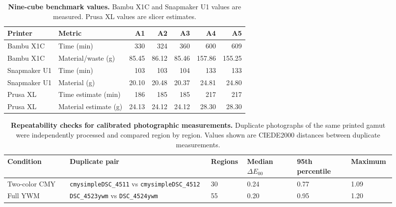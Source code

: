 \documentclass[preprint,12pt,authoryear]{elsarticle}
\begin{document}
\begin{table}[H]
\centering
\caption{\textbf{Nine-cube benchmark values.}
Bambu X1C and Snapmaker U1 values are measured. Prusa XL values are slicer estimates.}
\small
\begin{tabular}{llrrrrr}
\toprule
Printer & Metric & A1 & A2 & A3 & A4 & A5 \\
\midrule
Bambu X1C & Time (min) & 330 & 324 & 360 & 600 & 609 \\
Bambu X1C & Material/waste (g) & 85.45 & 86.12 & 85.46 & 157.86 & 155.25 \\
Snapmaker U1 & Time (min) & 103 & 103 & 104 & 133 & 133 \\
Snapmaker U1 & Material (g) & 20.10 & 20.48 & 20.37 & 24.81 & 24.80 \\
Prusa XL & Time estimate (min) & 186 & 185 & 185 & 217 & 217 \\
Prusa XL & Material estimate (g) & 24.13 & 24.12 & 24.12 & 28.30 & 28.30 \\
\bottomrule
\end{tabular}
\label{tab:supp-benchmark-values}
\end{table}

\begin{table}[H]
\centering
\caption{\textbf{Repeatability checks for calibrated photographic measurements.}
Duplicate photographs of the same printed gamut were independently processed and compared region by region. Values shown are CIEDE2000 distances between duplicate measurements.}
\scriptsize
\setlength{\tabcolsep}{2pt}
\begin{tabular}{@{}p{0.15\linewidth}p{0.34\linewidth}p{0.08\linewidth}p{0.12\linewidth}p{0.13\linewidth}p{0.10\linewidth}@{}}
\toprule
Condition & Duplicate pair & Regions & Median \(\Delta E_{00}\) & 95th percentile & Maximum \\
\midrule
Two-color CMY & \texttt{cmysimpleDSC\_4511} vs \texttt{cmysimpleDSC\_4512} & 30 & 0.24 & 0.77 & 1.09 \\
Full YWM & \texttt{DSC\_4523ywm} vs \texttt{DSC\_4524ywm} & 55 & 0.20 & 0.95 & 1.20 \\
\bottomrule
\end{tabular}
\label{tab:supp-repeatability}
\end{table}
\end{document}
